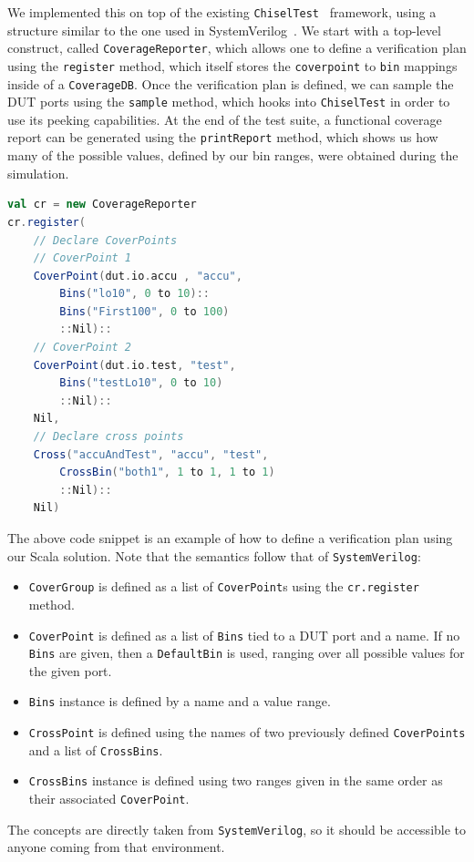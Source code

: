 \documentclass[runningheads]{llncs}
\begin{document}
We implemented this on top of the existing \texttt{ChiselTest}~\cite{chisel:tester2} framework, using a structure similar to the one used in SystemVerilog~\cite{spear2008systemverilog}. We start with a top-level construct, called \texttt{CoverageReporter}, which allows one to define a verification plan using the \texttt{register} method, which itself stores the \texttt{coverpoint} to \texttt{bin} mappings inside of a \texttt{CoverageDB}. Once the verification plan is defined, we can sample the DUT ports using the \texttt{sample} method, which hooks into \texttt{ChiselTest} in order to use its peeking capabilities. At the end of the test suite, a functional coverage report can be generated using the \texttt{printReport} method, which shows us how many of the possible values, defined by our bin ranges, were obtained during the simulation.
\newpage
\begin{lstlisting}[language=scala]
val cr = new CoverageReporter
cr.register(
    // Declare CoverPoints
    // CoverPoint 1
    CoverPoint(dut.io.accu , "accu",
        Bins("lo10", 0 to 10)::
        Bins("First100", 0 to 100)
        ::Nil)::
    // CoverPoint 2
    CoverPoint(dut.io.test, "test", 
        Bins("testLo10", 0 to 10)
        ::Nil)::
    Nil,
    // Declare cross points
    Cross("accuAndTest", "accu", "test",
        CrossBin("both1", 1 to 1, 1 to 1)
        ::Nil)::
    Nil)
\end{lstlisting}
The above code snippet is an example of how to define a verification plan using our Scala solution. Note that the semantics follow that of \texttt{SystemVerilog}:
\begin{itemize}
    \item \texttt{CoverGroup} is defined as a list of \texttt{CoverPoint}s using the \texttt{cr.register} method.
    \item \texttt{CoverPoint} is defined as a list of \texttt{Bins} tied to a DUT port and a name. If no \texttt{Bins} are given, then a \texttt{DefaultBin} is used, ranging over all possible values for the given port.
    \item \texttt{Bins} instance is defined by a name and a value range.
    \item \texttt{CrossPoint} is defined using the names of two previously defined \texttt{CoverPoints} and a list of \texttt{CrossBins}.
    \item \texttt{CrossBins} instance is defined using two ranges given in the same order as their associated \texttt{CoverPoint}.
\end{itemize}
The concepts are directly taken from \texttt{SystemVerilog}, so it should be accessible to anyone coming from that environment. 
\end{document}
